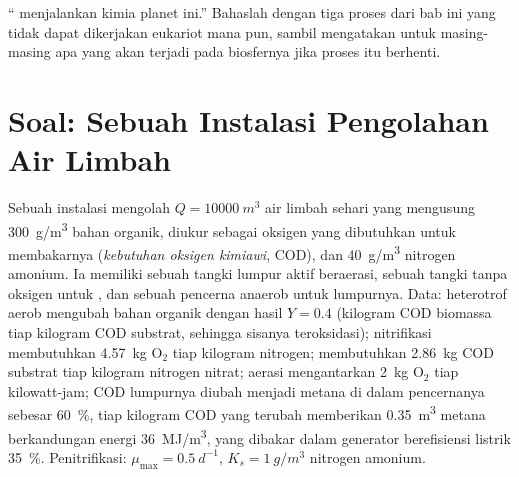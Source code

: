 \begin{exercise}[$\star\star\star$]\label{exo:b2:microbial-metabolism:12}
`` menjalankan kimia planet ini.'' Bahaslah dengan tiga proses
dari bab ini yang tidak dapat dikerjakan eukariot mana pun, sambil
mengatakan untuk masing-masing apa yang akan terjadi pada biosfernya
jika proses itu berhenti.
\end{exercise}

\section{Soal: Sebuah Instalasi Pengolahan Air Limbah}

\begin{problem}
\label{pb:b2:microbial-metabolism:1}
Sebuah instalasi mengolah $Q = \qty{10000}{m^3}$ air limbah sehari yang
mengusung \qty{300}{g/m^3} bahan organik, diukur sebagai oksigen yang
dibutuhkan untuk membakarnya (\emph{kebutuhan oksigen kimiawi}, COD),
dan \qty{40}{g/m^3} nitrogen amonium. Ia memiliki sebuah tangki lumpur
aktif beraerasi, sebuah tangki tanpa oksigen untuk , dan
sebuah pencerna anaerob untuk lumpurnya. Data: heterotrof aerob
mengubah bahan organik dengan hasil $Y = 0.4$ (kilogram COD biomassa
tiap kilogram COD substrat, sehingga sisanya teroksidasi);
nitrifikasi membutuhkan \qty{4.57}{kg} $\mathrm{O_2}$ tiap kilogram
nitrogen;  membutuhkan \qty{2.86}{kg} COD substrat tiap
kilogram nitrogen nitrat; aerasi mengantarkan \qty{2}{kg}
$\mathrm{O_2}$ tiap kilowatt-jam; COD lumpurnya diubah menjadi
metana di dalam pencernanya sebesar \qty{60}{\%}, tiap kilogram COD
yang terubah memberikan \qty{0.35}{m^3} metana berkandungan energi
\qty{36}{MJ/m^3}, yang dibakar dalam generator berefisiensi listrik
\qty{35}{\%}. Penitrifikasi: $\mu_{\max} = \qty{0.5}{d^{-1}}$, $K_s =
\qty{1}{g/m^3}$ nitrogen amonium.


\end{problem}
